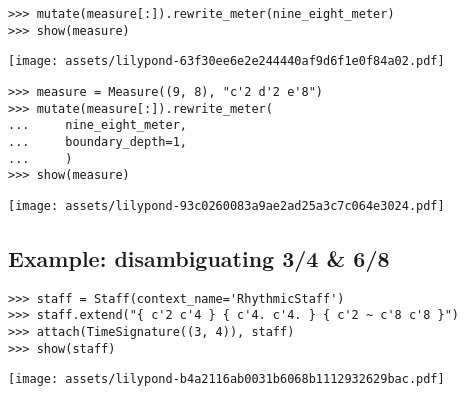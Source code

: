 \begin{singlespacing}
\vspace{-0.5\baselineskip}
\begin{lstlisting}
>>> mutate(measure[:]).rewrite_meter(nine_eight_meter)
>>> show(measure)
\end{lstlisting}
\texttt{[image: assets/lilypond-63f30ee6e2e244440af9d6f1e0f84a02.pdf]}
\end{singlespacing}

\begin{comment}
<abjad>
measure = Measure((9, 8), "c'2 d'2 e'8")
mutate(measure[:]).rewrite_meter(
    nine_eight_meter,
    boundary_depth=1,
    )
show(measure)
</abjad>
\end{comment}

\begin{singlespacing}
\vspace{-0.5\baselineskip}
\begin{lstlisting}
>>> measure = Measure((9, 8), "c'2 d'2 e'8")
>>> mutate(measure[:]).rewrite_meter(
...     nine_eight_meter,
...     boundary_depth=1,
...     )
>>> show(measure)
\end{lstlisting}
\texttt{[image: assets/lilypond-93c0260083a9ae2ad25a3c7c064e3024.pdf]}
\end{singlespacing}

\subsection{Example: disambiguating 3/4 \& 6/8} %

\begin{comment}
<abjad>
staff = Staff(context_name='RhythmicStaff')
staff.extend("{ c'2 c'4 } { c'4. c'4. } { c'2 ~ c'8 c'8 }")
attach(TimeSignature((3, 4)), staff)
show(staff)
</abjad>
\end{comment}

\begin{singlespacing}
\vspace{-0.5\baselineskip}
\begin{lstlisting}
>>> staff = Staff(context_name='RhythmicStaff')
>>> staff.extend("{ c'2 c'4 } { c'4. c'4. } { c'2 ~ c'8 c'8 }")
>>> attach(TimeSignature((3, 4)), staff)
>>> show(staff)
\end{lstlisting}
\texttt{[image: assets/lilypond-b4a2116ab0031b6068b1112932629bac.pdf]}
\end{singlespacing}

